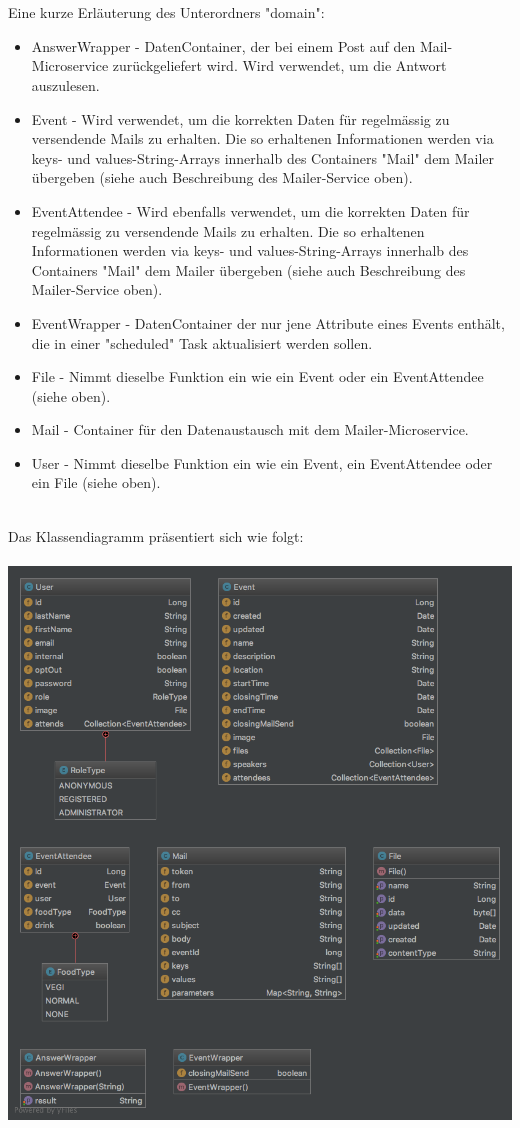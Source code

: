 \documentclass[11pt]{article} %
\begin{document}
\\
\\
Eine kurze Erläuterung des Unterordners "domain":
\begin{itemize}
\item AnswerWrapper - DatenContainer, der bei einem Post auf den Mail-Microservice zurückgeliefert wird. Wird verwendet, um die Antwort auszulesen.
\item Event - Wird verwendet, um die korrekten Daten für regelmässig zu versendende Mails zu erhalten. Die so erhaltenen Informationen werden via keys- und values-String-Arrays innerhalb des Containers "Mail" dem Mailer übergeben (siehe auch Beschreibung des Mailer-Service oben).
\item EventAttendee - Wird ebenfalls verwendet, um die korrekten Daten für regelmässig zu versendende Mails zu erhalten. Die so erhaltenen Informationen werden via keys- und values-String-Arrays innerhalb des Containers "Mail" dem Mailer übergeben (siehe auch Beschreibung des Mailer-Service oben).
\item EventWrapper - DatenContainer der nur jene Attribute eines Events enthält, die in einer "scheduled" Task aktualisiert werden sollen.
\item File - Nimmt dieselbe Funktion ein wie ein Event oder ein EventAttendee (siehe oben).
\item Mail - Container für den Datenaustausch mit dem Mailer-Microservice.
\item User - Nimmt dieselbe Funktion ein wie ein Event, ein EventAttendee oder ein File (siehe oben).
\end{itemize}
\leavevmode \\
Das Klassendiagramm präsentiert sich wie folgt:
\\
\\
\includegraphics[width=1.0\textwidth]{class-diagrams/Scheduler-domain}
\\
\\
\end{document}
